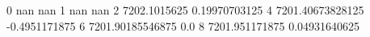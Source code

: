 0 nan nan
1 nan nan
2 7202.1015625 0.19970703125
4 7201.40673828125 -0.4951171875
6 7201.90185546875 0.0
8 7201.951171875 0.04931640625
